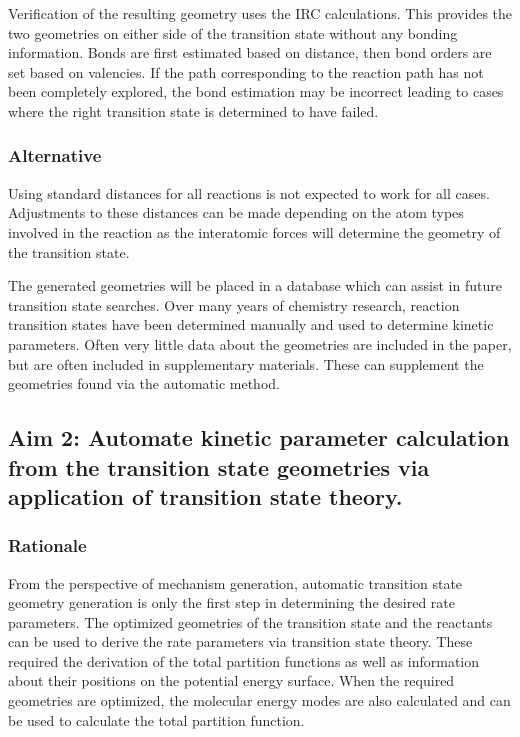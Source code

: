 \documentclass[12pt]{article}
\begin{document}
Verification of the resulting geometry uses the IRC calculations. This provides the two geometries on either side of the transition state without any bonding information. Bonds are first estimated based on distance, then bond orders are set based on valencies. If the path corresponding to the reaction path has not been completely explored, the bond estimation may be incorrect leading to cases where the right transition state is determined to have failed.

\subsubsection{Alternative}

Using standard distances for all reactions is not expected to work for all cases. Adjustments to these distances can be made depending on the atom types involved in the reaction as the interatomic forces will determine the geometry of the transition state.

The generated geometries will be placed in a database which can assist in future transition state searches. Over many years of chemistry research, reaction transition states have been determined manually and used to determine kinetic parameters. Often very little data about the geometries are included in the paper, but are often included in supplementary materials. These can supplement the geometries found via the automatic method.

\subsection{Aim 2: Automate kinetic parameter calculation from the transition state geometries via application of transition state theory.}
\subsubsection{Rationale}

From the perspective of mechanism generation, automatic transition state geometry generation is only the first step in determining the desired rate parameters. The optimized geometries of the transition state and the reactants can be used to derive the rate parameters via transition state theory. These required the derivation of the total partition functions as well as information about their positions on the potential energy surface. When the required geometries are optimized, the molecular energy modes are also calculated and can be used to calculate the total partition function.
\end{document}
